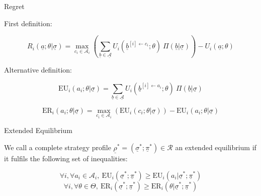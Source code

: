 \documentclass{beamer}
\theoremstyle{definition}
\begin{document}
\begin{frame}{Regret}

First definition:

    \begin{equation}
    R_i(\underline{a};\theta | \underline{\sigma}) = 
    \max_{c_i \in \mathcal{A}_i} 
    \left ( 
    \sum_{\underline{b} \in \underline{\mathcal{A}}} U_i(\underline{b}^{[i] \leftarrow c_i};\theta) \ \Pi(\underline{b}|\underline{\sigma})
    \right )
    -U_i(\underline{a};\theta)
\end{equation}

Alternative definition:

    \begin{equation}
    \label{defeq:EUMatrix}
        \mathrm{EU}_i(a_i;\theta | \underline{\sigma}) = 
        \sum_{\underline{b} \in \underline{\mathcal{A}}} U_i(\underline{b}^{[i] \leftarrow a_i};\theta) \ \Pi(\underline{b}|\underline{\sigma})
    \end{equation}

        \begin{equation}
    \label{eq:RegretMatrix}
        \mathrm{ER}_i(a_i;\theta | \underline{\sigma}) =
        \max_{c_i \in \mathcal{A}_i} \left ( \mathrm{EU}_i(c_i;\theta | \underline{\sigma}) \right ) - \mathrm{EU}_i(a_i;\theta | \underline{\sigma})
    \end{equation}
    
\end{frame}

\begin{frame}{Extended Equilibrium}

    \begin{definition}
\label{def:ExEq}
We call a complete strategy profile $\underline{\rho}^* = (\underline{\sigma}^*;\underline{\pi}^*) \in \mathcal{R}$ an extended equilibrium if it fulfils the following set of inequalities:

    \begin{equation}
    \label{defeq:ExtendedEquilibriumEU}
        \forall i, \forall a_i \in \mathcal{A}_i, \  \mathrm{EU}_i(\underline{\sigma}^*;\underline{\pi}^*) \ge \mathrm{EU}_i(a_i | \underline{\sigma}^*;\underline{\pi}^*)
    \end{equation}
    \begin{equation}
    \label{defeq:ExtendedEquilibriumER}
        \forall i, \forall \theta \in \Theta, \  \mathrm{ER}_i(\underline{\sigma}^*;\underline{\pi}^*) \ge \mathrm{ER}_i(\theta | \underline{\sigma}^*;\underline{\pi}^*)
    \end{equation}

\end{definition}
    
\end{frame}
\end{document}
